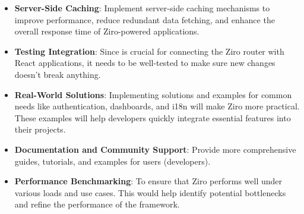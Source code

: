 \begin{itemize}
	\item  \textbf{Server-Side Caching}: Implement server-side caching mechanisms to improve performance, reduce redundant data fetching, and enhance the overall response time of Ziro-powered applications.

	\item \textbf{Testing  Integration}: Since  is crucial for connecting the Ziro router with React applications, it needs to be well-tested to make sure new changes doesn't break anything.

	\item  \textbf{Real-World Solutions}: Implementing solutions and examples for common needs like authentication, dashboards, and i18n will make Ziro more practical. These examples will help developers quickly integrate essential features into their projects.

	\item  \textbf{Documentation and Community Support}: Provide more comprehensive guides, tutorials, and examples for users (developers).

	\item  \textbf{Performance Benchmarking}: To ensure that Ziro performs well under various loads and use cases. This would help identify potential bottlenecks and refine the performance of the framework.

\end{itemize}

\pagebreak
